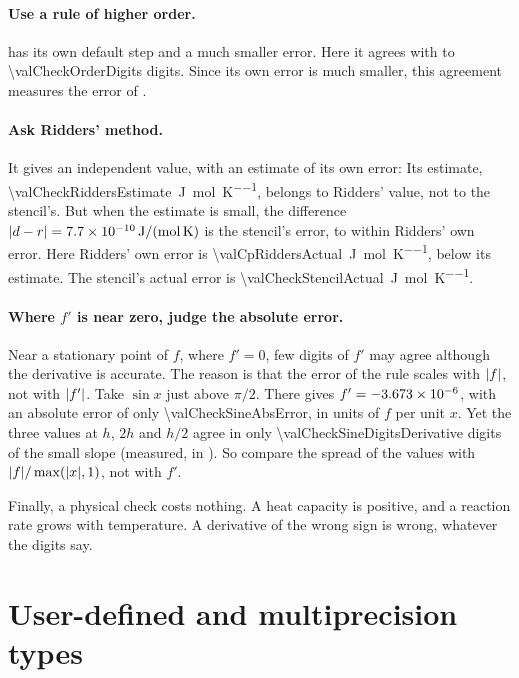 \paragraph{Use a rule of higher order.}  has its own default step and a much smaller error. Here it
agrees with  to \num{\valCheckOrderDigits} digits. Since its own error is much smaller, this
agreement measures the error of .


\paragraph{Ask Ridders' method.} It gives an independent value, with an estimate of its own error:
Its estimate, \SI{\valCheckRiddersEstimate}{\joule\per\mole\per\kelvin}, belongs to Ridders' value, not to the
stencil's. But when the estimate is small, the difference
$\lvert d - r \rvert = \SI{7.7e-10}{\joule\per\mole\per\kelvin}$ is the stencil's error, to within Ridders' own
error. Here Ridders' own error is \SI{\valCpRiddersActual}{\joule\per\mole\per\kelvin}, below its estimate. The
stencil's actual error is \SI{\valCheckStencilActual}{\joule\per\mole\per\kelvin}.

\paragraph{Where $f'$ is near zero, judge the absolute error.} Near a stationary point of $f$, where $f' = 0$, few
digits of $f'$ may agree although the derivative is accurate. The reason is that the error of the rule scales with
$\lvert f \rvert$, not with $\lvert f' \rvert$. Take $\sin x$ just above $\pi/2$. There  gives
$f' = \num{-3.673e-6}$, with an absolute error of only \num{\valCheckSineAbsError}, in units of $f$ per
unit $x$. Yet the three values at $h$, $2h$ and $h/2$ agree in only \num{\valCheckSineDigitsDerivative} digits of the
small slope (measured,  in ). So compare the spread of the values
with $\lvert f \rvert / \max(\lvert x \rvert, 1)$, not with $f'$.

Finally, a physical check costs nothing. A heat capacity is positive, and a reaction rate grows with temperature. A
derivative of the wrong sign is wrong, whatever the digits say.

\section{User-defined and multiprecision types}\label{sec:using-types}

